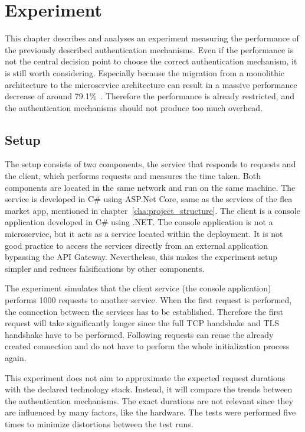 \chapter{Experiment}
\label{cha:experiment}
This chapter describes and analyses an experiment measuring the performance of the previously described authentication mechanisms.
Even if the performance is not the central decision point to choose the correct authentication mechanism, it is still worth considering.
Especially because the migration from a monolithic architecture to the microservice architecture can result in a massive performance decrease of around 79.1\%~\cite{ueda2016workload}.
Therefore the performance is already restricted, and the authentication mechanisms should not produce too much overhead.

\section{Setup}
The setup consists of two components, the service that responds to requests and the client, which performs requests and measures the time taken.
Both components are located in the same network and run on the same machine.
The service is developed in C\# using ASP.Net Core, same as the services of the flea market app, mentioned in chapter~\ref{cha:project_structure}.
The client is a console application developed in C\# using .NET.
The console application is not a microservice, but it acts as a service located within the deployment.
It is not good practice to access the services directly from an external application bypassing the API Gateway.
Nevertheless, this makes the experiment setup simpler and reduces falsifications by other components. 

The experiment simulates that the client service (the console application) performs 1000 requests to another service.
When the first request is performed, the connection between the services has to be established.
Therefore the first request will take significantly longer since the full TCP handshake and TLS handshake have to be performed.
Following requests can reuse the already created connection and do not have to perform the whole initialization process again.

This experiment does not aim to approximate the expected request durations with the declared technology stack.
Instead, it will compare the trends between the authentication mechanisms.
The exact durations are not relevant since they are influenced by many factors, like the hardware.
The tests were performed five times to minimize distortions between the test runs.

